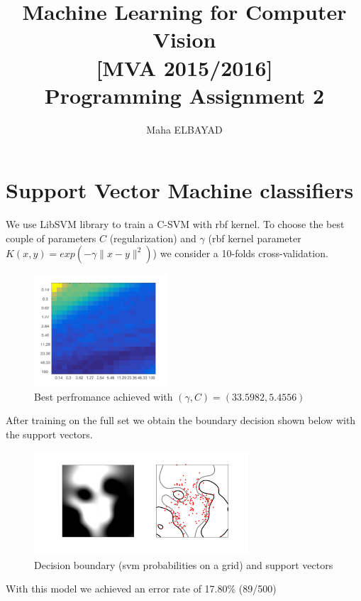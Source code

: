 \documentclass{acmsiggraph}
\title{Machine Learning for Computer Vision\\ {\large [MVA 2015/2016]}\\
\vspace{10pt}
Programming Assignment 2}
\author{Maha ELBAYAD
}
\newcommand{\1}{\mathbbm{1}}
\begin{document}
\maketitle
\section{Support Vector Machine classifiers}
We use LibSVM library to train a C-SVM with rbf kernel. To choose the best couple of parameters $C$ (regularization) and $\gamma$ (rbf kernel parameter $K(x,y)=exp(-\gamma\|x-y\|^2)$) we consider a 10-folds cross-validation.
\begin{figure}[H]
\centering
\includegraphics[width=5cm]{cv_error}
\caption*{Best perfromance achieved with $(\gamma,C)=(33.5982,5.4556)$}
\end{figure}
After training on the full set we obtain the boundary decision shown below with the support vectors.
\begin{figure}[H]
\centering
\includegraphics[width=8cm]{values_svm}
\caption*{Decision boundary (svm probabilities on a grid) and support vectors}
\end{figure}
With this model we achieved an error rate of 17.80\% (89/500)
\end{document}
